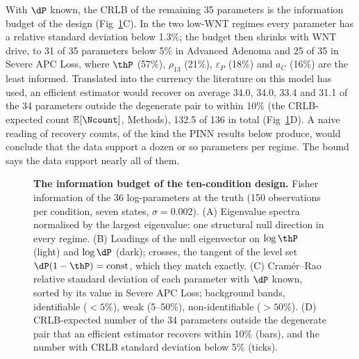With $\dP$ known, the CRLB of the remaining 35 parameters is the information
budget of the design (Fig~\ref{fig:info}C). In the two low-WNT regimes every
parameter has a relative standard deviation below 1.3\%; the budget then
shrinks with WNT drive, to 31 of 35 parameters below 5\% in Advanced Adenoma
and 25 of 35 in Severe APC Loss, where $\thP$ (57\%), $\rho_{13}$ (21\%),
$\varepsilon_P$ (18\%) and $a_C$ (16\%) are the least informed. Translated into
the currency the literature on this model has used, an efficient estimator would
recover on average 34.0, 34.0, 33.4 and 31.1 of the 34 parameters outside the
degenerate pair to within 10\% (the CRLB-expected count $\mathbb{E}[\Ncount]$,
Methods), 132.5 of 136 in total (Fig~\ref{fig:info}D). A naive reading of recovery counts, of the kind the PINN results below produce,
would conclude that the data support a dozen or so parameters per regime. The
bound says the data support nearly all of them.

\begin{figure}[tbp]
\centering
{}
\caption{\textbf{The information budget of the ten-condition design.} Fisher
information of the 36 log-parameters at the truth (150 observations per
condition, seven states, $\sigma=0.002$). (A) Eigenvalue spectra normalised by
the largest eigenvalue: one structural null direction in every regime. (B)
Loadings of the null eigenvector on $\log\thP$ (light) and $\log\dP$ (dark);
crosses, the tangent of the level set $\dP(1-\thP)=\text{const}$, which they
match exactly. (C) Cram\'er--Rao relative standard deviation of each parameter
with $\dP$ known, sorted by its value in Severe APC Loss; background bands,
identifiable ($<5\%$), weak (5--50\%), non-identifiable ($>50\%$). (D)
CRLB-expected number of the 34 parameters outside the degenerate pair that an
efficient estimator recovers within 10\% (bars), and the number with CRLB
standard deviation below 5\% (ticks).}
\label{fig:info}
\end{figure}
